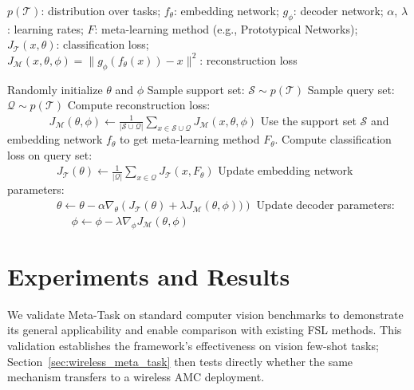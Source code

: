 \begin{algorithm}[t]
\caption{Meta-Tasks: Task-Decoder}
\label{alg:task_decoder}
\begin{algorithmic}[1]
\REQUIRE $p(\mathcal{T})$: distribution over tasks; 
\REQUIRE $f_{\theta}$: embedding network;
\REQUIRE $g_{\phi}$: decoder network; 
\REQUIRE $\alpha$, $\lambda$: learning rates;
\REQUIRE $F$: meta-learning method (e.g., Prototypical Networks);
\REQUIRE $J_{\mathcal{T}}(x, \theta)$: classification loss;
\\$J_{\mathcal{M}}(x, \theta, \phi) = \| g_{\phi}(f_{\theta}(x)) - x \|^2$: reconstruction loss

\STATE Randomly initialize $\theta$ and $\phi$
    \STATE Sample support set: $\mathcal{S} \sim p(\mathcal{T})$
    \STATE Sample query set: $\mathcal{Q} \sim p(\mathcal{T})$
    \STATE Compute reconstruction loss:\\
    $~~~~~~~~~~~~~~~~~{J}_{\mathcal{M}}(\theta, \phi) \leftarrow \frac{1}{|\mathcal{S} \cup \mathcal{Q}|} \sum_{x \in \mathcal{S} \cup \mathcal{Q}} J_{\mathcal{M}}(x, \theta, \phi)$
    \STATE Use the support set $\mathcal{S}$ and embedding network $f_{\theta}$ to get meta-learning method $F_{\theta}$.
    \STATE Compute classification loss on query set:\\
    $
    ~~~~~~~~~~~~~~~~~~~~{J}_{\mathcal{T}}(\theta) \leftarrow \frac{1}{|\mathcal{Q}|} \sum_{x \in \mathcal{Q}} J_{\mathcal{T}}(x, F_{\theta})
    $
    \STATE Update embedding network parameters:\\
    $
    ~~~~~~~~~~~~~~~~~~~~\theta \leftarrow \theta - \alpha \nabla_{\theta} \left( {J}_{\mathcal{T}}(\theta) + \lambda {J}_{\mathcal{M}}(\theta, \phi)) \right)
    $
    \STATE Update decoder parameters:\\
    $
    ~~~~~~~~~~~~~~~~~~~~~~~~~~\phi \leftarrow \phi - \lambda \nabla_{\phi} {J}_{\mathcal{M}}(\theta, \phi)
    $
\ENDWHILE
\end{algorithmic}
\end{algorithm}


\section{Experiments and Results}\label{sec:results}

We validate Meta-Task on standard computer vision benchmarks to demonstrate its general applicability and enable comparison with existing FSL methods. This validation establishes the framework's effectiveness on vision few-shot tasks; Section~\ref{sec:wireless_meta_task} then tests directly whether the same mechanism transfers to a wireless AMC deployment.

